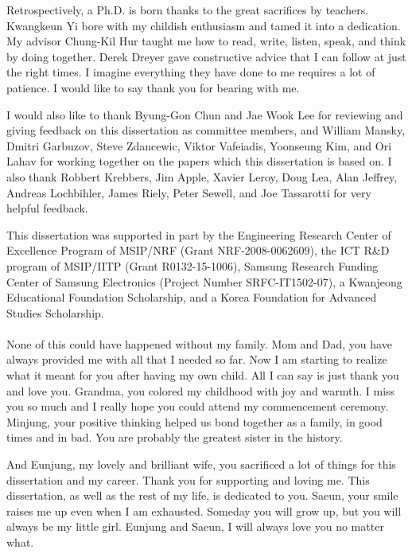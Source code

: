 \acknowledgement

Retrospectively, a Ph.D. is born thanks to the great sacrifices by teachers.  Kwangkeun Yi bore with
my childish enthusiasm and tamed it into a dedication.  My advisor Chung-Kil Hur taught me how to
read, write, listen, speak, and think by doing together.  Derek Dreyer gave constructive advice that
I can follow at just the right times.  I imagine everything they have done to me requires a lot of
patience.  I would like to say thank you for bearing with me.

I would also like to thank Byung-Gon Chun and Jae Wook Lee for reviewing and giving feedback on this
dissertation as committee members, and William Mansky, Dmitri Garbuzov, Steve Zdancewic, Viktor
Vafeiadis, Yoonseung Kim, and Ori Lahav for working together on the papers which this dissertation
is based on.  I also thank Robbert Krebbers, Jim Apple, Xavier Leroy, Doug Lea, Alan Jeffrey,
Andreas Lochbihler, James Riely, Peter Sewell, and Joe Tassarotti for very helpful feedback.

This dissertation was supported in part by the Engineering Research Center of Excellence Program of
MSIP/NRF (Grant NRF-2008-0062609), the ICT R\&D program of MSIP/IITP (Grant R0132-15-1006), Samsung
Research Funding Center of Samsung Electronics (Project Number SRFC-IT1502-07), a Kwanjeong
Educational Foundation Scholarship, and a Korea Foundation for Advanced Studies Scholarship.


\paragraph*{}

None of this could have happened without my family.  Mom and Dad, you have always provided me with
all that I needed so far.  Now I am starting to realize what it meant for you after having my own
child.  All I can say is just thank you and love you.  Grandma, you colored my childhood with joy
and warmth.  I miss you so much and I really hope you could attend my commencement ceremony.
Minjung, your positive thinking helped us bond together as a family, in good times and in bad.  You
are probably the greatest sister in the history.

And Eunjung, my lovely and brilliant wife, you sacrificed a lot of things for this dissertation and
my career.  Thank you for supporting and loving me.  This dissertation, as well as the rest of my
life, is dedicated to you.  Saeun, your smile raises me up even when I am exhausted.  Someday you
will grow up, but you will always be my little girl.  Eunjung and Saeun, I will always love you no
matter what.



